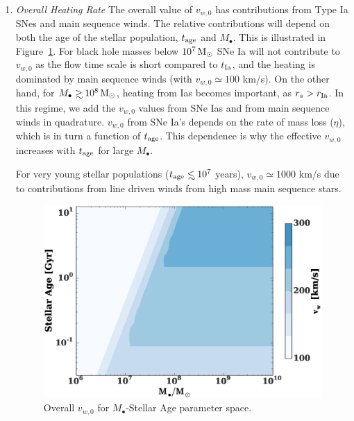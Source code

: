 \documentclass[usenatbib,fleqn]{mn2e}
\newcommand\lsim{\mathrel{\rlap{\lower4pt\hbox{\hskip1pt$\sim$}}
        \raise1pt\hbox{$<$}}}
\newcommand\gsim{\mathrel{\rlap{\lower4pt\hbox{\hskip1pt$\sim$}}
        \raise1pt\hbox{$>$}}}
\newcommand{\rs}{r_s}
\newcommand{\Mbh}[1][]{M_{\bullet#1}}
\newcommand{\rIa}{r_{\rm Ia}}
\newcommand{\vwO}{v_{w,0}}
\newcommand{\tage}{t_{\rm age}}
\begin{document}
\begin{enumerate}
\item \emph{Overall Heating Rate}
The overall value of $\vwO$ has contributions from Type Ia SNes  and main sequence winds.  The relative
contributions will depend on both the age of the stellar population, $t_{\rm age}$ and $\Mbh$.  This is
illustrated in Figure~\ref{fig:vweff}. For black hole masses below $10^7 \,{\rm M_\odot}$ SNe Ia will not contribute to 
$\vwO$ as the flow time scale is short compared to $t_{\rm Ia}$, and the heating is dominated by main
sequence winds (with $\vwO\simeq 100$ km/s).  On the other hand, for $\Mbh \gsim 10^8 \Msun$, heating
from Ias becomes important, as $\rs>\rIa$.  In this regime, we add the $\vwO$ values from SNe Ias and from
main sequence winds in quadrature. $\vwO$ from SNe Ia's depends on the rate of mass loss ($\eta$), which is
in turn a function of $t_{\rm age}$. This dependence is why the effective $\vwO$ increases with $\tage$ for
large $\Mbh$. 

For very young stellar populations ($\tage \lsim 10^7$ years),  $\vwO\simeq 1000$ km/s due to contributions
from line driven winds from high mass main sequence stars.

\begin{figure}
\includegraphics[width=\columnwidth]{vw-contour.eps}
\caption{\label{fig:vweff} Overall $\vwO$ for $\Mbh$-Stellar Age parameter space.}
\end{figure}

\end{enumerate}
\end{document}
